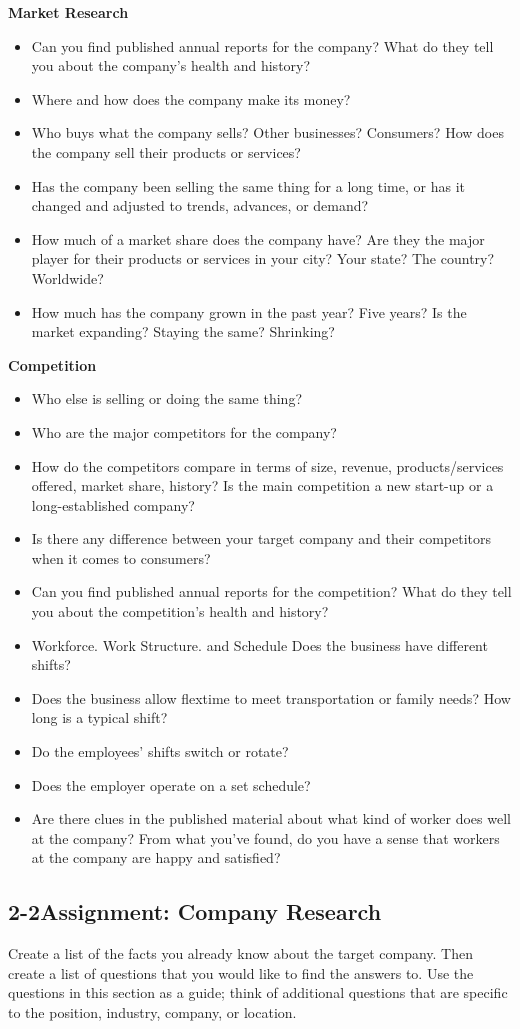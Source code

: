 \textbf{Market Research}
\begin{itemize}[leftmargin=*]
\item Can you find published annual reports for the company? What do they tell you about the company's health and history?
\item Where and how does the company make its money?
\item Who buys what the company sells? Other businesses? Consumers? How does the company sell their products or services?
\item Has the company been selling the same thing for a long time, or has it changed and adjusted to trends, advances, or demand?
\item How much of a market share does the company have? Are they the major player for their products or services in your city? Your state? The country? Worldwide?
\item How much has the company grown in the past year? Five years? Is the market expanding? Staying the same? Shrinking?
\end{itemize}
\textbf{Competition}
\begin{itemize}[leftmargin=*]
\item Who else is selling or doing the same thing?
\item Who are the major competitors for the company?
\item How do the competitors compare in terms of size, revenue, products/services offered, market share, history? Is the main competition a new start-up or a long-established company?
\item Is there any difference between your target company and their competitors when it comes to consumers?
\item Can you find published annual reports for the competition? What do they tell you about the competition's health and history?
\item Workforce. Work Structure. and Schedule Does the business have different shifts?
\item Does the business allow flextime to meet transportation or family needs? How long is a typical shift?
\item Do the employees' shifts switch or rotate?
\item Does the employer operate on a set schedule?
\item Are there clues in the published material about what kind of worker does well at the company? From what you've found, do you have a sense that workers at the company are happy and satisfied?
\end{itemize}
\pagebreak \subsection*{2-2\quad Assignment: Company Research}
Create a list of the facts you already know about the target company. Then create a list of questions that you would like to find the answers to. Use the questions in this section as a guide; think of additional questions that are specific to the position, industry, company, or location.

